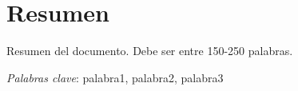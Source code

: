 \chapter*{Resumen}
Resumen del documento. Debe ser entre 150-250 palabras.

\textit{Palabras clave}: palabra1, palabra2, palabra3

\tableofcontents
\thispagestyle{empty}

\listoffigures
\thispagestyle{empty}

\listoftables
\thispagestyle{empty}